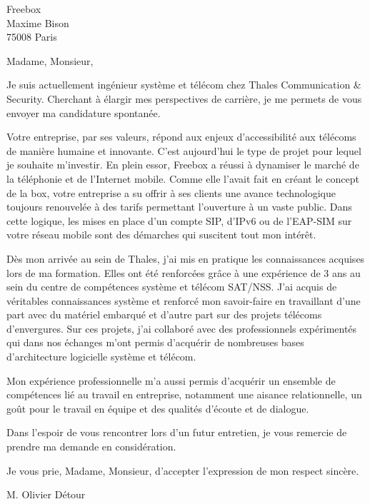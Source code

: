 \documentclass[12pt]{letter}
\def\companyname{Freebox}
\def\companyservice{Maxime Bison}
\def\companyzip{75008}
\def\companycity{Paris}
\begin{document}
  \begin{letter}{\companyname \\ \companyservice \\ \companyzip{} \companycity}
    \opening{Madame, Monsieur,}

      \indent Je suis actuellement ingénieur système et télécom chez Thales Communication
      \& Security. Cherchant \`a élargir mes perspectives de carrière, je me permets de vous
      envoyer ma candidature spontanée.
      
      \indent Votre entreprise, par ses valeurs, répond aux enjeux d'accessibilité aux
      télécoms de manière humaine et innovante. C'est aujourd'hui le type de projet pour
      lequel je souhaite m'investir. En plein essor, Freebox a réussi à dynamiser le marché
      de la téléphonie et de l'Internet mobile. Comme elle l'avait fait en créant le concept
      de la box, votre entreprise a su offrir à ses clients une avance technologique toujours
      renouvelée à des tarifs permettant l'ouverture à un vaste public. Dans cette logique,
      les mises en place d'un compte SIP, d'IPv6 ou de l'EAP-SIM sur votre réseau mobile
      sont des démarches qui suscitent tout mon intérêt.

      \indent Dès mon arrivée au sein de Thales, j'ai mis en pratique les connaissances
      acquises lors de ma formation. Elles ont été renforcées grâce \`a une expérience
      de 3 ans au sein du centre de compétences système et télécom SAT/NSS.  J'ai acquis
      de véritables connaissances système et renforcé mon savoir-faire en travaillant
      d'une part avec du matériel embarqué et d'autre part sur des projets télécoms
      d'envergures. Sur ces projets, j'ai collaboré avec des professionnels expérimentés
      qui dans nos échanges m'ont permis d'acquérir de nombreuses bases d'architecture
      logicielle système et télécom.

      \indent Mon expérience professionnelle m'a aussi permis d'acquérir un ensemble de
      compétences lié au travail en entreprise, notamment une aisance relationnelle, un
      goût pour le travail en équipe et des qualités d'écoute et de dialogue.

      \indent Dans l'espoir de vous rencontrer lors d'un futur entretien, je vous remercie
      de prendre ma demande en considération.
      
      \indent Je vous prie, Madame, Monsieur, d'accepter l'expression de mon respect sincère.


    \closing{M. Olivier D\'etour}

  \end{letter}
\end{document}
